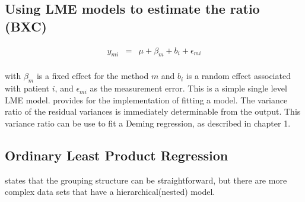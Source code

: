\documentclass[12pt, a4paper]{report}
\theoremstyle{plain}
\theoremstyle{definition}
\theoremstyle{remark}
\begin{document}
	
	
	
	
	
	
	
	
	
	
	
	
	
	

	\subsection{Using LME models to estimate the ratio (BXC) }
	
	\begin{eqnarray*}
		y_{mi} &=& \mu + \beta_{m} + b_{i} + \epsilon_{mi}\\
	\end{eqnarray*}
	
	with $\beta_{m}$ is a fixed effect for the method $m$ and $b_{i}$ is a random effect associated with patient $i$, and
	$\epsilon_{mi}$ as the measurement error. This is a simple single level LME model. \citet{pb} provides for the implementation of fitting a model. The variance ratio of the residual variances is immediately determinable from the output. This variance ratio can be use to fit a Deming regression, as described in chapter 1.
	
	
	
	
	

	
	
	
	
	
	
	\subsection{Ordinary Least Product Regression}
	\citet{ludbrook97} states that the grouping structure can be
	straightforward, but there are more complex data sets that have a hierarchical(nested) model.
	
\end{document}

